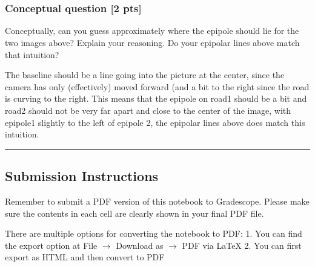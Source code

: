 \documentclass[11pt]{article}
\begin{document}
    \begin{center}
    \end{center}
    { \hspace*{\fill} \\}
    
    \begin{center}
    \end{center}
    { \hspace*{\fill} \\}
    
    \subsubsection{Conceptual question {[}2
pts{]}}\label{conceptual-question-2-pts}

Conceptually, can you guess approximately where the epipole should lie
for the two images above? Explain your reasoning. Do your epipolar lines
above match that intuition?

    The baseline should be a line going into the picture at the center,
since the camera has only (effectively) moved forward (and a bit to the
right since the road is curving to the right. This means that the
epipole on road1 should be a bit and road2 should not be very far apart
and close to the center of the image, with epipole1 slightly to the left
of epipole 2, the epipolar lines above does match this intuition.

    \begin{center}\rule{0.5\linewidth}{\linethickness}\end{center}

\subsection{Submission Instructions}\label{submission-instructions}

Remember to submit a PDF version of this notebook to Gradescope. Please
make sure the contents in each cell are clearly shown in your final PDF
file.

There are multiple options for converting the notebook to PDF: 1. You
can find the export option at File \(\rightarrow\) Download as
\(\rightarrow\) PDF via LaTeX 2. You can first export as HTML and then
convert to PDF


    
    
    
    
\end{document}
